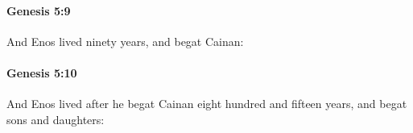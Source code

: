 		\paragraph{Genesis 5:9} %
			\label{GENESIS-5-9}

			And Enos lived ninety years, and begat Cainan:


		\paragraph{Genesis 5:10} %
			\label{GENESIS-5-10}

			And Enos lived after he begat Cainan eight hundred and fifteen years, and begat sons and daughters:


